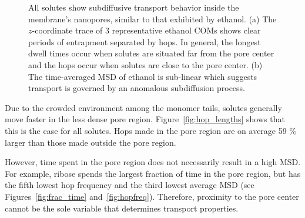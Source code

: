 \documentclass{article}
\begin{document}
\begin{figure}
\begin{subfigure}{0.49\linewidth}
  \caption{}\label{fig:example_msd}
  \end{subfigure}
  \caption{All solutes show subdiffusive transport behavior inside the membrane's
  nanopores, similar to that exhibited by ethanol. (a) The $z$-coordinate trace of
  3 representative ethanol COMs shows clear periods of entrapment separated by hops.
  In general, the longest dwell times occur when solutes are situated far from the
  pore center and the hops occur when solutes are close to the pore center. (b) The
  time-averaged MSD of ethanol is sub-linear which suggests transport is governed
  by an anomalous subdiffusion process.}\label{fig:qualitative_mechanisms}

  \end{figure}
  
  Due to the crowded environment among the monomer tails, solutes generally move
  faster in the less dense pore region. Figure~\ref{fig:hop_lengths} shows that 
  this is the case for all solutes. Hops made in the pore region are on average
  59 \% larger than those made outside the pore region.
  
  However, time spent in the pore region does not necessarily result
  in a high MSD. For example, ribose spends the largest fraction of time in 
  the pore region, but has the fifth lowest hop frequency and the third 
  lowest average MSD (see Figures~\ref{fig:frac_time} and~\ref{fig:hopfreq}).
  Therefore, proximity to the pore center cannot be the sole variable that
  determines transport properties.
  
\end{document}
